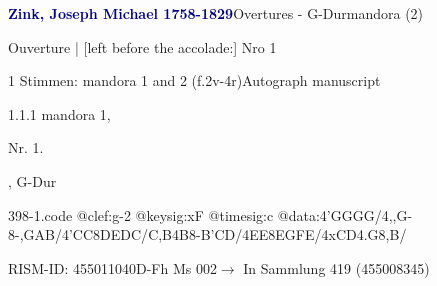 \documentclass[twocolumn]{book}
\begin{document}
\par \vspace{7pt} \textcolor{darkblue}{\textbf{Zink, Joseph Michael  1758-1829}}\hfillplus{\textbf{[398]}}\newline Overtures - G-Dur\newline mandora (2)
\par \begin{itshape} Ouverture | [left before the accolade:] Nro 1\end{itshape} 
\par \textcolor{darkblue}{}  1 Stimmen: mandora 1 and 2  (f.2v-4r)\newline Autograph manuscript
\par 1.1.1  mandora 1, \begin{itshape}Nr. 1.\end{itshape}, G-Dur  
\begin{filecontents*}{398-1.code}
@clef:g-2
@keysig:xF
@timesig:c
@data:4'GGGG/4,,G-8-{,GAB}/4'CC8DEDC/{C,B}4B8-{B'C}D/4EE{8EG}{FE}/4xCD4.G8,B/
\end{filecontents*}
\newline
%
\par RISM-ID: 455011040\newline D-Fh  Ms 002\newline $\rightarrow$ In Sammlung 419 (455008345)
      
\end{document}
